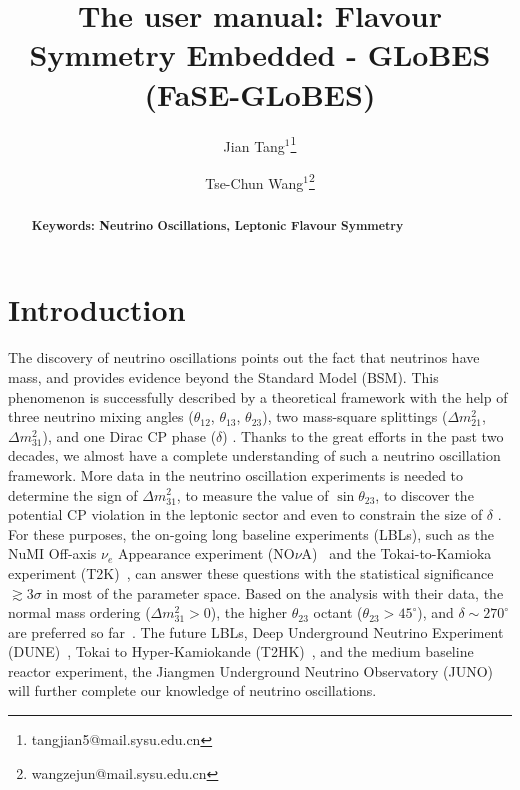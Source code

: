 \documentclass[aps,prd,nofootinbib,preprint]{revtex4}
\begin{document}
 
\title{The user manual: Flavour Symmetry Embedded - GLoBES (FaSE-GLoBES)} %
\author{Jian Tang$^1$\footnote{tangjian5@mail.sysu.edu.cn}}
\author{Tse-Chun Wang$^1$\footnote{wangzejun@mail.sysu.edu.cn}}

\begin{abstract}
\textbf{Keywords: Neutrino Oscillations, Leptonic Flavour Symmetry}  
\end{abstract}

\maketitle

\section{Introduction}\label{sec:intro}

The discovery of neutrino oscillations points out the fact that neutrinos have mass, and provides evidence beyond the Standard Model (BSM). This phenomenon is successfully described by a theoretical framework with the help of three neutrino mixing angles ($\theta_{12}$, $\theta_{13}$, $\theta_{23}$), two mass-square splittings ($\Delta m_{21}^2$, $\Delta m_{31}^2$), and one Dirac CP phase ($\delta$) \cite{Pontecorvo:1967fh,Maki:1962mu,Pontecorvo:1957qd,Esteban:2018azc}. Thanks to the great efforts in the past two decades, we almost have a complete understanding of such a neutrino oscillation framework. More data in the neutrino oscillation experiments is needed to determine the sign of $\Delta m_{31}^2$, to measure the value of $\sin\theta_{23}$, to discover the potential CP violation in the leptonic sector and even to constrain the size of $\delta$ \cite{Esteban:2018azc}. For these purposes, the on-going long baseline experiments (LBLs), such as the NuMI Off-axis $\nu_e$ Appearance experiment (NO$\nu$A)~\cite{Ayres:2007tu} and the Tokai-to-Kamioka experiment (T2K)~\cite{Abe:2011ks}, can answer these questions with the statistical significance $\gtrsim 3\sigma$ in most of the parameter space. Based on the analysis with their data, the normal mass ordering ($\Delta m_{31}^2>0$), the higher $\theta_{23}$ octant ($\theta_{23}>45^\circ$), and $\delta\sim270^\circ$ are preferred so far~\cite{Esteban:2018azc}. The future LBLs, Deep Underground Neutrino Experiment (DUNE)~\cite{Acciarri:2015uup}, Tokai to Hyper-Kamiokande (T2HK)~\cite{Abe:2014oxa}, and the medium baseline reactor experiment, the Jiangmen Underground Neutrino Observatory (JUNO)~\cite{Djurcic:2015vqa,An:2015jdp} will further complete our knowledge of neutrino oscillations.
\end{document}
